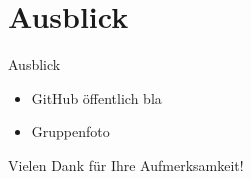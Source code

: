 \documentclass[18pt]{beamer}
\begin{document}
\section{Ausblick}
\begin{frame}{Ausblick}
\begin{itemize}
	\item GitHub öffentlich bla
	\item Gruppenfoto
\end{itemize}
\end{frame}

\appendix

\begin{frame}{}

\begin{LARGE}
\begin{center}
	Vielen Dank für Ihre Aufmerksamkeit!
\end{center}
\end{LARGE}
\end{frame}
\end{document}
